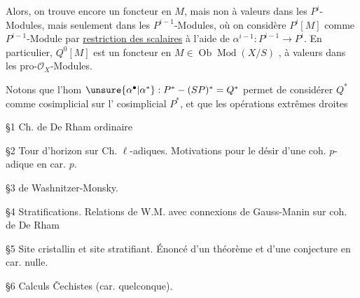 Alors, on trouve encore un foncteur en $M$, mais  non à valeurs dans les $P^i$-Modules, mais 
seulement dans les $P^{i-1}$-Modules, où on considère $P^i[M]$ comme $P^{i-1}$-Module par \uline{restriction des scalaires} à l'aide de $\alpha^{i-1}:P^{i-1}\longrightarrow P^i$.
En particulier, $Q^0[M]$ est  un foncteur en
$M\in\operatorname{Ob}\operatorname{Mod}(X/S)$
,
à valeurs dans les pro-$\mathcal{O}_X$-Modules.

\deleted{[$P^0[M]=M$ \deleted{\unsure{est}} \unsure{doit} être considéré comme un foncteur à valeurs dans $\operatorname{Ab}(X)$]}

Notons que l'hom $\unsure{\alpha^\bullet|\alpha^*}:P^*\mathbin{-}(SP)^*=Q^*$ permet de considérer $Q^*$ comme    cosimplicial sur l' cosimplicial $P^*$, et que les opérations extrêmes droites


\S 1 Ch. de De Rham ordinaire

\S 2 Tour d'horizon sur Ch. $\ell$-adiques. Motivations pour le désir d'une coh. $p$-adique en car. $p$.

\S 3  de Washnitzer-Monsky.

\S 4 Stratifications. Relations de W.M. avec connexions de Gauss-Manin sur coh. de De Rham

\S 5  Site cristallin et site stratifiant. Énoncé  d'un théorème et d'une conjecture en car. nulle.

\S 6 Calculs \v{C}echistes (car. quelconque).

